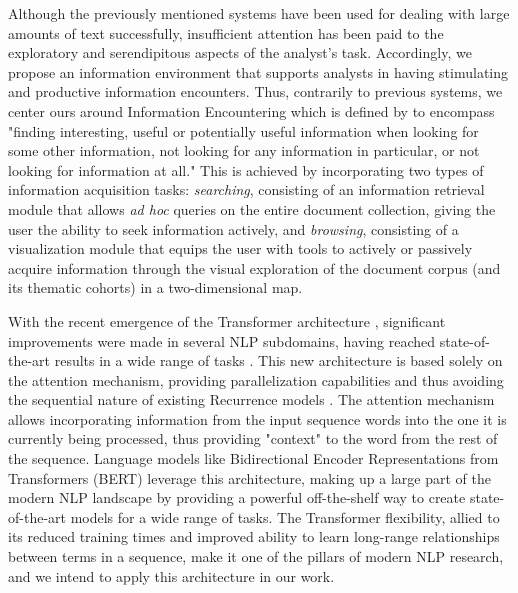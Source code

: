 \documentclass[a4paper]{article}
\begin{document}
Although the previously mentioned systems have been used for dealing with large amounts of text successfully, insufficient attention has been paid to the exploratory and serendipitous aspects of the analyst's task. Accordingly, we propose an information environment that supports analysts in having stimulating and productive information encounters. Thus, contrarily to previous systems, we center ours around Information Encountering which is defined by \citet{erdelez2020} to encompass "finding interesting, useful or potentially useful information when looking for some other information, not looking for any information in particular, or not looking for information at all." This is achieved by incorporating two types of information acquisition tasks: \emph{searching}, consisting of an information retrieval module that allows \emph{ad hoc} queries on the entire document collection, giving the user the ability to seek information actively, and \emph{browsing}, consisting of a visualization module that equips the user with tools to actively or passively acquire information through the visual exploration of the document corpus (and its thematic cohorts) in a two-dimensional map. 

With the recent emergence of the Transformer architecture \citep{vaswani2017}, significant improvements were made in several NLP subdomains, having reached state-of-the-art results in a wide range of tasks \citep{vaswani2017}. This new architecture is based solely on the attention mechanism, providing parallelization capabilities and thus avoiding the sequential nature of existing Recurrence models \citep{hochreiter1997, cho2014}. The attention mechanism allows incorporating information from the input sequence words into the one it is currently being processed, thus providing "context" to the word from the rest of the sequence. Language models like Bidirectional Encoder Representations from Transformers (BERT) \citep{devlin2019} leverage this architecture, making up a large part of the modern NLP landscape by providing a powerful off-the-shelf way to create state-of-the-art models for a wide range of tasks. The Transformer flexibility, allied to its reduced training times and improved ability to learn long-range relationships between terms in a sequence, make it one of the pillars of modern NLP research, and we intend to apply this architecture in our work.
\end{document}
